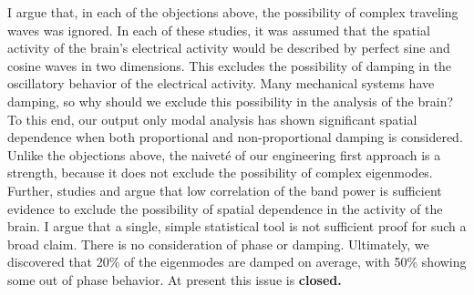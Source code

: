 I argue that, in each of the objections above, the possibility of complex traveling waves was ignored. In each of these studies, it was assumed that the spatial activity of the brain's electrical activity would be described by perfect sine and cosine waves in two dimensions. This excludes the possibility of damping in the oscillatory behavior of the electrical activity. Many mechanical systems have damping, so why should we exclude this possibility in the analysis of the brain? To this end, our output only modal analysis has shown significant spatial dependence when both proportional and non-proportional damping is considered. Unlike the objections above, the naiveté of our engineering first approach is a strength, because it does not exclude the possibility of complex eigenmodes. Further, studies \cite{doi:10.1152/jn.00409.2005} and \cite{BULLOCK1995161} argue that low correlation of the band power is sufficient evidence to exclude the possibility of spatial dependence in the activity of the brain. I argue that a single, simple statistical tool is not sufficient proof for such a broad claim. There is no consideration of phase or damping.  Ultimately, we discovered that 20\% of the eigenmodes are damped on average, with 50\% showing some out of phase behavior. At present this issue is \textbf{closed.}
